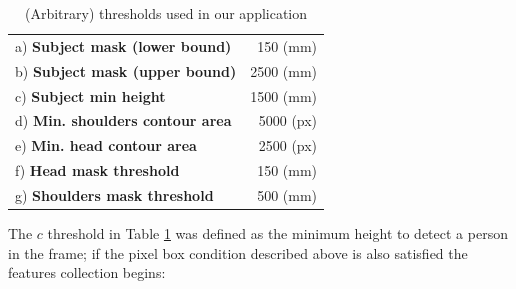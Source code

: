 \documentclass[letterpaper, 11pt, conference]{ieeeconf} %
\begin{document}
\begin{table}[b]
\centering
\begin{tabular}{lr}
	a) \textbf{Subject mask (lower bound)} & 150 (mm)\\
	b) \textbf{Subject mask (upper bound)} & 2500 (mm)\\
	c) \textbf{Subject min height} & 1500 (mm)\\
	d) \textbf{Min. shoulders contour area} & 5000 (px)\\
	e) \textbf{Min. head contour area} & 2500 (px)\\
	f) \textbf{Head mask threshold} & 150 (mm)\\
	g) \textbf{Shoulders mask threshold} & 500 (mm)\\
\end{tabular}
\caption{(Arbitrary) thresholds used in our application} \label{t3}
\end{table}

The $c$ threshold in Table \ref{t3} was defined as the minimum height to detect a person in the frame; if the pixel box condition described above is also satisfied the features collection begins:
\end{document}
